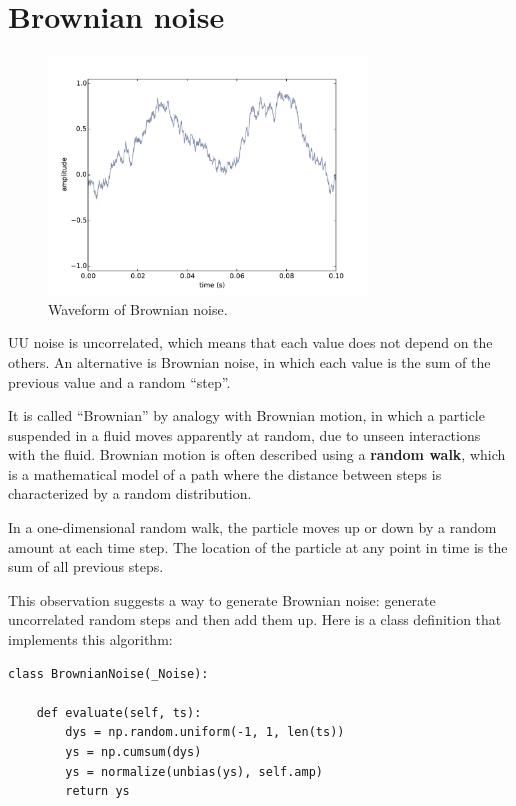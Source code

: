 \documentclass[12pt]{book}
\begin{document}
\section{Brownian noise}
\label{brownian}

\begin{figure}
\centerline{\includegraphics[height=2.5in]{figs/rednoise0.pdf}}
\caption{Waveform of Brownian noise.}
\label{fig.rednoise0}
\end{figure}

UU noise is uncorrelated, which means that each value does not depend
on the others.  An alternative is Brownian noise, in which each value
is the sum of the previous value and a random ``step''.

It is called ``Brownian'' by analogy with Brownian motion, in which a
particle suspended in a fluid moves apparently at random, due to
unseen interactions with the fluid.  Brownian motion is often
described using a {\bf random walk}, which is a mathematical model 
of a path where the distance between steps is characterized by a
random distribution.

In a one-dimensional random walk, the particle moves up or down
by a random amount at each time step.  The location of the particle
at any point in time is the sum of all previous steps.

This observation suggests a way to generate Brownian noise:
generate uncorrelated random steps and then add them up.
Here is a class definition that implements this algorithm:

\begin{verbatim}
class BrownianNoise(_Noise):

    def evaluate(self, ts):
        dys = np.random.uniform(-1, 1, len(ts))
        ys = np.cumsum(dys)
        ys = normalize(unbias(ys), self.amp)
        return ys
\end{verbatim}
\end{document}

